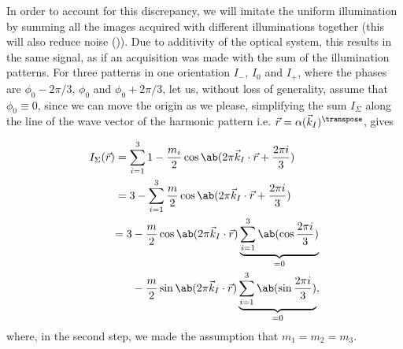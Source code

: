 \begin{marginfigure}[*-2]
    \caption{Acquisitions of 9 wide field images with harmonic patterned illuminations. The orientations are labelled
    1, 2 and 3 and the phases \(-\), \(0\) and \(+\).}
\end{marginfigure}

In order to account for this discrepancy, we will imitate the uniform illumination by summing all the images acquired
    with different illuminations together (this will also reduce noise ()).
Due to additivity of the optical system, this results in the same signal, as if an acquisition was made with the sum
    of the illumination patterns.
For three patterns in one orientation \(I_-\), \(I_0\) and \(I_+\), where the phases are \(\phi_0 - 2\pi/3\), \(\phi_0\)
    and \(\phi_0 + 2\pi/3\), let us, without loss of generality, assume that \(\phi_0 \equiv 0\), since we can move the 
    origin as we please, simplifying the sum \(I_\Sigma\) along the line of the wave vector of the harmonic pattern
    i.e. \(\vec{r} = \alpha(\vec{k}_I)^{\transpose}\), gives


    \begin{equation*}
        \begin{split}
            I_\Sigma (\vec{r}) &= \sum_{i=1}^3 1 - \frac{m_i}{2} \cos\ab(2\pi \vec{k}_I \cdot \vec{r} 
                + \frac{2\pi i}{3}) \\
                               &= 3 - \sum_{i=1}^3 \frac{m}{2} \cos\ab(2\pi \vec{k}_I \cdot \vec{r} + 
                                \frac{2\pi i}{3}) \\
                               &\begin{split}
                                   = 3 &-\frac{m}{2} \cos\ab(2\pi \vec{k}_I \cdot \vec{r})
                                    \underbrace{\sum_{i=1}^3\ab(\cos\frac{2\pi i}{3})}_{=0} \\
                                       &- \frac{m}{2} \sin\ab(2\pi  \vec{k}_I \cdot \vec{r})
                                    \underbrace{\sum_{i=1}^3\ab(\sin\frac{2\pi i}{3})}_{=0},
                                \end{split}
        \end{split}
    \end{equation*}
    where, in the second step, we made the assumption that \(m_1 = m_2 = m_3\).

